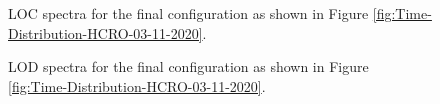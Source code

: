\documentclass[12pt]{article}
\begin{document}
%
%
\begin{figure}[ht!]
\caption{LOC spectra for the final configuration as shown in Figure \ref{fig:Time-Distribution-HCRO-03-11-2020}.}
\label{fig:10MHZ-TEST-LOC-ALL-CLK}
\end{figure}
%
%
\begin{figure}[ht!]
\caption{LOD spectra for the final configuration as shown in Figure \ref{fig:Time-Distribution-HCRO-03-11-2020}.}
\label{fig:10MHZ-TEST-LOD-ALL-CLK}
\end{figure}
%


%
%
\newpage



\end{document}
